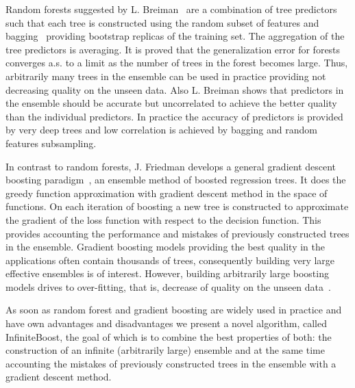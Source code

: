 Random forests suggested by L. Breiman~\cite{key-random-forest} are a combination of tree predictors such that each tree is constructed using the random subset of features and bagging~\cite{key-bagging} providing bootstrap replicas of the training set.
The aggregation of the tree predictors is averaging.
It is proved that the generalization error for forests converges a.s. to a limit as the number of trees in the forest becomes large. 
Thus, arbitrarily many trees in the ensemble can be used in practice providing not decreasing quality on the unseen data. %
Also L. Breiman shows that predictors in the ensemble should be accurate but uncorrelated to achieve the better quality than the individual predictors. 
In practice the accuracy of predictors is provided by very deep trees and low correlation is achieved by bagging and random features subsampling.

In contrast to random forests, J. Friedman develops a general gradient descent boosting paradigm~\cite{key-gb,key-sgb}, an ensemble method of boosted regression trees.
It does the greedy function approximation with gradient descent method in the space of functions. 
On each iteration of boosting a new tree is constructed to approximate the gradient of the loss function with respect to the decision function. 
This provides accounting the performance and mistakes of previously constructed trees in the ensemble.
Gradient boosting models providing the best quality in the applications often contain thousands of trees, consequently building very large effective ensembles is of interest.
However, building arbitrarily large boosting models drives to over-fitting, that is, decrease of quality on the unseen data~\cite{key-brownboost, key-dart}. 

As soon as random forest and gradient boosting are widely used in practice and have own advantages and disadvantages we present a novel algorithm, called InfiniteBoost, the goal of which is to combine the best properties of both: the construction of an infinite (arbitrarily large) ensemble and at the same time accounting the mistakes of previously constructed trees in the ensemble with a gradient descent method.


